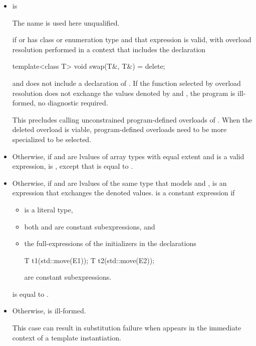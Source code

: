 \begin{itemize}
\item
   is 
\begin{footnote}
The name  is used
  here unqualified.
\end{footnote}
if  or 
  has class or enumeration type and that expression is valid, with
  overload resolution performed in a context that includes the declaration
\begin{codeblock}
template<class T>
  void swap(T&, T&) = delete;
\end{codeblock}
  and does not include a declaration of .
  If the function selected by overload resolution does not
  exchange the values denoted by
   and ,
  the program is ill-formed, no diagnostic required.
  \begin{note}
  This precludes calling unconstrained program-defined overloads of
  . When the deleted overload is viable, program-defined overloads
  need to be more specialized to be selected.
  \end{note}

\item
  Otherwise, if  and 
  are lvalues of array types
  with equal extent and 
  is a valid expression,
   is ,
  except that
   is equal to
  .

\item
  Otherwise, if  and  are lvalues of the
  same type  that models  and
  ,
   is an expression that exchanges the denoted values.
   is a constant expression if
  \begin{itemize}
  \item {} is a literal type,
  \item both  and  are
    constant subexpressions, and
  \item the full-expressions of the initializers in the declarations
\begin{codeblock}
T t1(std::move(E1));
T t2(std::move(E2));
\end{codeblock}
are constant subexpressions.
  \end{itemize}
   is equal to
  .

\item
  Otherwise,  is ill-formed.
  \begin{note}
  This case can result in substitution failure when 
  appears in the immediate context of a template instantiation.
  \end{note}
\end{itemize}

